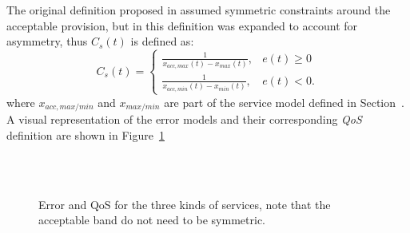 The original definition proposed in \cite{bondy2014performance} assumed symmetric constraints around the acceptable provision, but in \cite{bondy2016method} this definition was expanded to account for asymmetry, thus $C_s(t)$ is defined as:
\begin{equation}
C_{s}(t) = 
\begin{cases}
\frac{1}{x_{acc,max}(t) - x_{max}(t)}, & e(t) \geq 0 \\
\frac{1}{x_{acc,min}(t) - x_{min}(t)}, & e(t) < 0.
\end{cases}\label{eq:MAINcst}
\end{equation}
where $x_{acc,max/min}$ and $x_{max/min}$ are part of the service model defined in Section~. A visual representation of the error models and their corresponding \emph{QoS} definition are shown in Figure~\ref{fig:MAINerrorQoS}

\begin{figure}[htpb!]
\centering
{} \\
\\
\caption{Error and QoS for the three kinds of services, note that the acceptable band do not need to be symmetric.}
\label{fig:MAINerrorQoS}
\end{figure}

